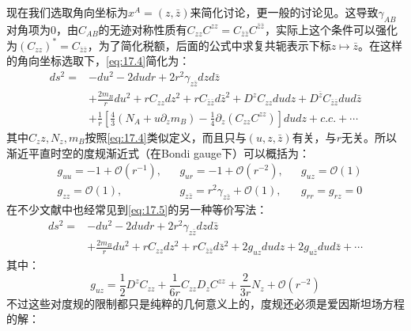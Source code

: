 现在我们选取角向坐标为$x^A=(z,\bar z)$来简化讨论，更一般的讨论见\cite{Compere:2019qed}。这导致$\gamma_{AB}$对角项为0，由$C_{AB}$的无迹对称性质有$C_{zz}C^{zz}=C_{\bar z\bar z}C^{\bar z\bar z}$，实际上这个条件可以强化为$(C_{zz})^*=C_{\bar z\bar z}$，为了简化税额，后面的公式中求复共轭表示下标$z\mapsto \bar z$。在这样的角向坐标选取下，\ref{eq:17.4}简化为：
\begin{equation}\label{eq:17.5}
	\begin{aligned}
		ds^2=&-du^2-2dudr+2r^2\gamma_{z\bar z}dzd{\bar z}\\
		&+\frac{2m_B}{r}du^2+rC_{zz}dz^2+rC_{\bar z\bar z}d{\bar z}^2+D^z C_{zz}dudz+D^{\bar z}C_{\bar z\bar z}dud\bar z\\
		&+\frac{1}{r}\left[\frac{4}{3}\left(N_A+u\partial_zm_B\right)-\frac{1}{4}\partial_z\left(C_{zz}C^{zz}\right)\right]dudz+c.c.+\cdots
	\end{aligned}
\end{equation}
其中$C_zz,N_z,m_B$按照\ref{eq:17.4}类似定义，而且只与$(u,z,\bar z)$有关，与$r$无关。所以渐近平直时空的度规渐近式（在Bondi gauge下）可以概括为：
\begin{align*}
	&g_{uu}=-1+\mathcal{O}(r^{-1}),&&g_{ur}=-1+\mathcal{O}(r^{-2}),&&g_{uz}=\mathcal{O}(1)\\
	&g_{zz}=\mathcal{O}(1),&&g_{z\bar z}=r^2\gamma_{z\bar z}+\mathcal{O}(1),&&g_{rr}=g_{rz}=0
\end{align*}
在不少文献中\cite{Pasterski:2021rjz,Kapec:2014opa,Raclariu:2021zjz}也经常见到\ref{eq:17.5}的另一种等价写法：
\begin{equation}\label{eq:17.6}
	\begin{aligned}
		ds^2=&-du^2-2dudr+2r^2\gamma_{z\bar z}dzd{\bar z}\\
		&+\frac{2m_B}{r}du^2+rC_{zz}dz^2+rC_{\bar z\bar z}d{\bar z}^2+2g_{uz}dudz+2g_{u\bar z}dud\bar z+\cdots
	\end{aligned}
\end{equation}
其中：
\begin{equation}
	g_{uz}=\frac{1}{2}D^zC_{zz}+\frac{1}{6r}C_{zz}D_zC^{zz}+\frac{2}{3r}N_z+\mathcal{O}(r^{-2})
\end{equation}
不过这些对度规的限制都只是纯粹的几何意义上的，度规还必须是爱因斯坦场方程的解：

